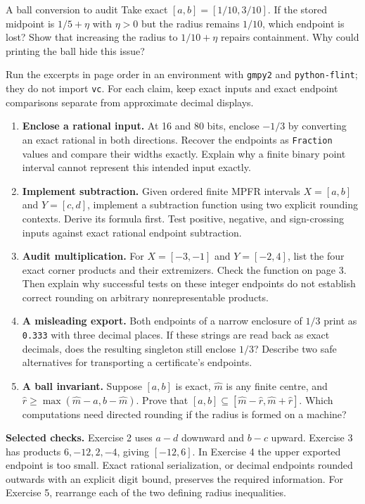 \begin{question}{A ball conversion to audit}
Take exact $[a,b]=[1/10,3/10]$. If the stored midpoint is $1/5+\eta$ with
$\eta>0$ but the radius remains $1/10$, which endpoint is lost? Show that increasing
the radius to $1/10+\eta$ repairs containment. Why could printing the ball hide this issue?
\end{question}

\newpage
{}
Run the excerpts in page order in an environment with \texttt{gmpy2} and
\texttt{python-flint}; they do not import \texttt{vc}. For each claim, keep exact
inputs and exact endpoint comparisons separate from approximate decimal displays.
\begin{enumerate}
\item \textbf{Enclose a rational input.} At 16 and 80 bits, enclose $-1/3$ by
converting an exact rational in both directions. Recover the endpoints as
\texttt{Fraction} values and compare their widths exactly. Explain why a finite
binary point interval cannot represent this intended input exactly.
\item \textbf{Implement subtraction.} Given ordered finite MPFR intervals
$X=[a,b]$ and $Y=[c,d]$, implement a subtraction function using two explicit
rounding contexts. Derive its formula first. Test positive, negative, and
sign-crossing inputs against exact rational endpoint subtraction.
\item \textbf{Audit multiplication.} For $X=[-3,-1]$ and $Y=[-2,4]$, list the
four exact corner products and their extremizers. Check the function on page 3.
Then explain why successful tests on these integer endpoints do not establish
correct rounding on arbitrary nonrepresentable products.
\item \textbf{A misleading export.} Both endpoints of a narrow enclosure of
$1/3$ print as \texttt{0.333} with three decimal places. If these strings are
read back as exact decimals, does the resulting singleton still enclose $1/3$?
Describe two safe alternatives for transporting a certificate's endpoints.
\item \textbf{A ball invariant.} Suppose $[a,b]$ is exact, $\widehat m$ is any
finite centre, and $\widehat r\ge\max(\widehat m-a,b-\widehat m)$.
Prove that $[a,b]\subseteq[\widehat m-\widehat r,\widehat m+\widehat r]$.
Which computations need directed rounding if the radius is formed on a machine?
\end{enumerate}
\textbf{Selected checks.} Exercise 2 uses $a-d$ downward and $b-c$ upward.
Exercise 3 has products $6,-12,2,-4$, giving $[-12,6]$. In Exercise 4 the upper
exported endpoint is too small. Exact rational serialization, or decimal endpoints
rounded outwards with an explicit digit bound, preserves the required information.
For Exercise 5, rearrange each of the two defining radius inequalities.

